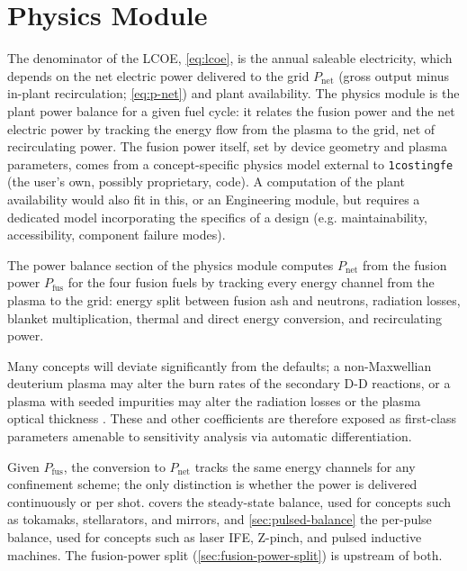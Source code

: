 \documentclass{article}
\begin{document}
\section{Physics Module}
\label{sec:physics-module}

The denominator of the LCOE, \cref{eq:lcoe}, is the annual saleable
electricity, which depends on the net electric power delivered to the grid
$P_{\text{net}}$ (gross output minus in-plant recirculation; \cref{eq:p-net})
and plant availability.
The physics module is the plant power balance for a given fuel cycle: it
relates the fusion power and the net electric power by tracking the energy
flow from the plasma to the grid, net of recirculating power. The fusion
power itself, set by device geometry and plasma parameters, comes from a
concept-specific physics model external to \texttt{1costingfe} (the user's
own, possibly proprietary, code).
A computation of the plant availability would also fit in this, or an Engineering module,
but requires a dedicated model incorporating the specifics of a design (e.g. maintainability, accessibility, component failure modes).

The power balance section of the physics module computes $P_{\text{net}}$
from the fusion power $P_{\text{fus}}$ for the four fusion fuels by tracking
every energy channel from the plasma to the grid: energy split between fusion ash and neutrons,
radiation losses, blanket multiplication, thermal and direct energy conversion, and
recirculating power.

Many concepts will deviate significantly from the defaults; a non-Maxwellian
deuterium plasma may alter the burn rates of the secondary D-D reactions,
or a plasma with seeded impurities may alter the radiation losses or the plasma optical thickness
\citep{frank2022}. These and other coefficients are therefore exposed as
first-class parameters amenable to sensitivity analysis via automatic differentiation.

Given $P_{\text{fus}}$, the conversion to $P_{\text{net}}$ tracks the same
energy channels for any confinement scheme; the only distinction is whether
the power is delivered continuously or per shot. 
covers the steady-state balance, used for concepts such as tokamaks,
stellarators, and mirrors, and \cref{sec:pulsed-balance} the per-pulse
balance, used for concepts such as laser IFE, Z-pinch, and pulsed inductive
machines. The fusion-power split (\cref{sec:fusion-power-split}) is upstream
of both.
\end{document}
